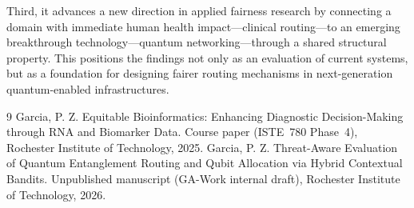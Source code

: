 \documentclass{IEEEtran}
\begin{document}
Third, it advances a new direction in applied fairness research by connecting
a domain with immediate human health impact---clinical routing---to an
emerging breakthrough technology---quantum networking---through a shared
structural property. This positions the findings not only as an evaluation
of current systems, but as a foundation for designing fairer routing
mechanisms in next-generation quantum-enabled infrastructures.

\begin{thebibliography}{9}\setlength{\itemsep}{0em}
Garcia, P. Z. Equitable Bioinformatics: Enhancing Diagnostic
Decision-Making through {RNA} and Biomarker Data. Course paper
(ISTE~780 Phase~4), Rochester Institute of Technology, 2025.
Garcia, P. Z. Threat-Aware Evaluation of Quantum Entanglement Routing
and Qubit Allocation via Hybrid Contextual Bandits. Unpublished
manuscript (GA-Work internal draft), Rochester Institute of Technology,
2026.
\end{thebibliography}
\end{document}
